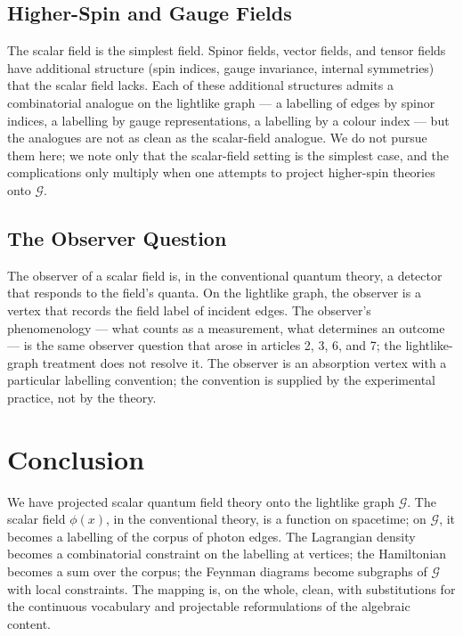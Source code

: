 \documentclass[11pt]{article}
\begin{document}
\subsection{Higher-Spin and Gauge Fields}

The scalar field is the simplest field. Spinor fields, vector fields, and tensor fields have additional structure (spin indices, gauge invariance, internal symmetries) that the scalar field lacks. Each of these additional structures admits a combinatorial analogue on the lightlike graph --- a labelling of edges by spinor indices, a labelling by gauge representations, a labelling by a colour index --- but the analogues are not as clean as the scalar-field analogue. We do not pursue them here; we note only that the scalar-field setting is the simplest case, and the complications only multiply when one attempts to project higher-spin theories onto $\mathcal{G}$.

\subsection{The Observer Question}

The observer of a scalar field is, in the conventional quantum theory, a detector that responds to the field's quanta. On the lightlike graph, the observer is a vertex that records the field label of incident edges. The observer's phenomenology --- what counts as a measurement, what determines an outcome --- is the same observer question that arose in articles 2, 3, 6, and 7; the lightlike-graph treatment does not resolve it. The observer is an absorption vertex with a particular labelling convention; the convention is supplied by the experimental practice, not by the theory.

\section{Conclusion}
\label{sec:conclusion}

We have projected scalar quantum field theory onto the lightlike graph $\mathcal{G}$. The scalar field $\phi(x)$, in the conventional theory, is a function on spacetime; on $\mathcal{G}$, it becomes a labelling of the corpus of photon edges. The Lagrangian density becomes a combinatorial constraint on the labelling at vertices; the Hamiltonian becomes a sum over the corpus; the Feynman diagrams become subgraphs of $\mathcal{G}$ with local constraints. The mapping is, on the whole, clean, with substitutions for the continuous vocabulary and projectable reformulations of the algebraic content.
\end{document}
